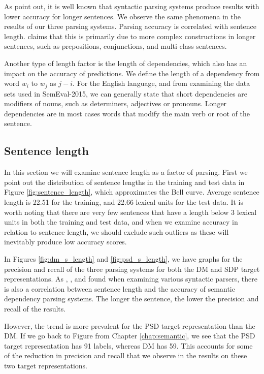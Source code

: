 As  point out, it is well known that syntactic parsing systems produce results with lower accuracy for longer sentences. We observe the same phenomena in the results of our three parsing systems. Parsing accuracy is correlated with sentence length.  claims that this is primarily due to more complex constructions in longer sentences, such as prepositions, conjunctions, and multi-class sentences.

Another type of length factor is the length of dependencies, which also has an impact on the accuracy of predictions. We define the length of a dependency from word $w_i$ to $w_j$ as $j - i$. For the English language, and from examining the data sets used in SemEval-2015, we can generally state that short dependencies are modifiers of nouns, such as determiners, adjectives or pronouns. Longer dependencies are in most cases words that modify the main verb or root of the sentence. 

\subsection{Sentence length}

In this section we will examine sentence length as a factor of parsing. First we point out the distribution of sentence lengths in the training and test data in Figure \ref{fig:sentence_length}, which approximates the Bell curve. Average sentence length is 22.51 for the training, and 22.66 lexical units for the test data. It is worth noting that there are very few sentences that have a length below 3 lexical units in both the training and test data, and when we examine accuracy in relation to sentence length, we should exclude such outliers as these will inevitably produce low accuracy scores. 

In Figures \ref{fig:dm_s_length} and \ref{fig:psd_s_length}, we have graphs for the precision and recall of the three parsing systems for both the DM and SDP target representations. As , , and  found when examining various syntactic parsers, there is also a correlation between sentence length and the accuracy of semantic dependency parsing systems. The longer the sentence, the lower the precision and recall of the results.

However, the trend is more prevalent for the PSD target representation than the DM. If we go back to Figure \label{fig:data} from Chapter \ref{chap:semantic}, we see that the PSD target representation has 91 labels, whereas DM has 59. This accounts for some of the reduction in precision and recall that we observe in the results on these two target representations.


